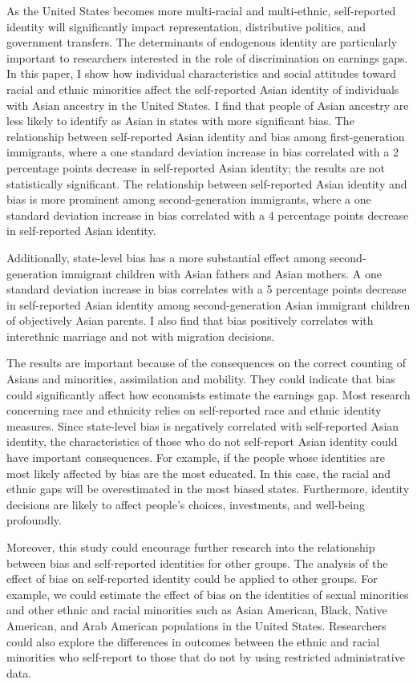 As the United States becomes more multi-racial and multi-ethnic, self-reported identity will significantly impact representation, distributive politics, and government transfers. The determinants of endogenous identity are particularly important to researchers interested in the role of discrimination on earnings gaps. In this paper, I show how individual characteristics and social attitudes toward racial and ethnic minorities affect the self-reported Asian identity of individuals with Asian ancestry in the United States. I find that people of Asian ancestry are less likely to identify as Asian in states with more significant bias. The relationship between self-reported Asian identity and bias among first-generation immigrants, where a one standard deviation increase in bias correlated with a 2 percentage points decrease in self-reported Asian identity; the results are not statistically significant. The relationship between self-reported Asian identity and bias is more prominent among second-generation immigrants, where a one standard deviation increase in bias correlated with a 4 percentage points decrease in self-reported Asian identity. 

Additionally, state-level bias has a more substantial effect among second-generation immigrant children with Asian fathers and Asian mothers. A one standard deviation increase in bias correlates with a 5 percentage points decrease in self-reported Asian identity among second-generation Asian immigrant children of objectively Asian parents. I also find that bias positively correlates with interethnic marriage and not with migration decisions.

The results are important because of the consequences on the correct counting of Asians and minorities, assimilation and mobility. They could indicate that bias could significantly affect how economists estimate the earnings gap. Most research concerning race and ethnicity relies on self-reported race and ethnic identity measures. Since state-level bias is negatively correlated with self-reported Asian identity, the characteristics of those who do not self-report Asian identity could have important consequences. For example, if the people whose identities are most likely affected by bias are the most educated. In this case, the racial and ethnic gaps will be overestimated in the most biased states. Furthermore, identity decisions are likely to affect people's choices, investments, and well-being profoundly. 

Moreover, this study could encourage further research into the relationship between bias and self-reported identities for other groups. The analysis of the effect of bias on self-reported identity could be applied to other groups. For example, we could estimate the effect of bias on the identities of sexual minorities and other ethnic and racial minorities such as Asian American, Black, Native American, and Arab American populations in the United States. Researchers could also explore the differences in outcomes between the ethnic and racial minorities who self-report to those that do not by using restricted administrative data. 
